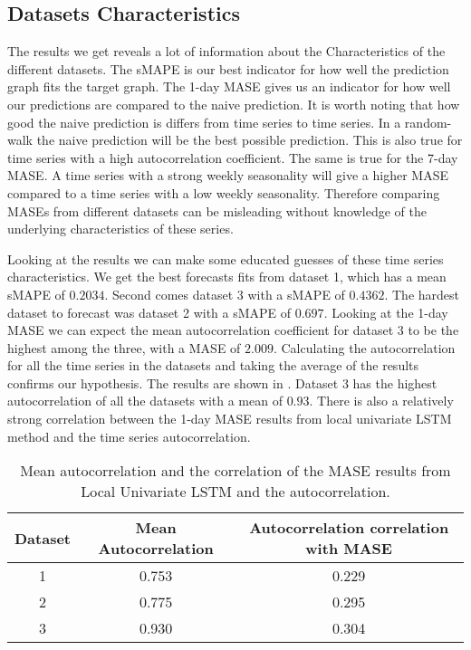 
\subsection{Datasets Characteristics}
The results we get reveals a lot of information about the Characteristics of the different datasets.
The sMAPE is our best indicator for how well the prediction graph fits the target graph.
The 1-day MASE gives us an indicator for how well our predictions are compared to the naive
prediction. It is worth noting that how good the naive prediction is differs from time series
to time series. In a random-walk the naive prediction will be the best possible prediction.
This is also true for time series with a high autocorrelation coefficient.
The same is true for the 7-day MASE. A time series with a strong weekly seasonality will
give a higher MASE compared to a time series with a low weekly seasonality.
Therefore comparing MASEs from different datasets can be misleading without knowledge of
the underlying characteristics of these series.

Looking at the results we can make some educated guesses of these time series characteristics.
We get the best forecasts fits from dataset 1, which has a mean sMAPE of $0.2034$.
Second comes dataset 3 with a sMAPE of $0.4362$. The hardest dataset to forecast was dataset 2 with a
sMAPE of $0.697$. Looking at the 1-day MASE we can expect the mean autocorrelation coefficient for
dataset 3 to be the highest among the three, with a MASE of $2.009$.
Calculating the autocorrelation for all the time series in the datasets and
taking the average of the results confirms our hypothesis. The results are shown in .
Dataset 3 has the highest autocorrelation of all the datasets with a mean
of $0.93$. There is also a relatively strong correlation between the 1-day MASE results
from local univariate LSTM method and the time series autocorrelation.

\begin{table}[htbp]
  \begin{center}
    \begin{tabular}{|c|c|c|}\hline\hline
      Dataset & Mean Autocorrelation & Autocorrelation correlation with MASE \\\hline
      1       & 0.753                & 0.229                                 \\\hline
      2       & 0.775                & 0.295                                 \\\hline
      3       & 0.930                & 0.304                                 \\\hline
    \end{tabular}
    \caption{Mean autocorrelation and the correlation of the MASE results from Local Univariate LSTM and the autocorrelation.}
  \end{center}
  \label{tab:datasets-autocorrelation}
\end{table}%

